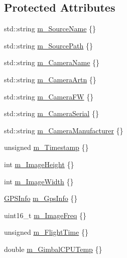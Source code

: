 \subsection*{Protected Attributes}
\begin{DoxyCompactItemize}
\item 
std\+::string \hyperlink{classwtl_1_1_source_meta_data_adb976a4739c879d6329023ffff10ec88}{m\+\_\+\+Source\+Name} \{\}
\item 
std\+::string \hyperlink{classwtl_1_1_source_meta_data_aeddfd5e6b783a06d66b1f19b4d932c03}{m\+\_\+\+Source\+Path} \{\}
\item 
std\+::string \hyperlink{classwtl_1_1_source_meta_data_afcd3f61eccdae1bdb42cd428bdf3a5ea}{m\+\_\+\+Camera\+Name} \{\}
\item 
std\+::string \hyperlink{classwtl_1_1_source_meta_data_aa4fb21498fb68acff7be512b2b452eb4}{m\+\_\+\+Camera\+Artn} \{\}
\item 
std\+::string \hyperlink{classwtl_1_1_source_meta_data_a53ecb2596fe7cf3817dbe30c973a27a3}{m\+\_\+\+Camera\+FW} \{\}
\item 
std\+::string \hyperlink{classwtl_1_1_source_meta_data_ab7de122fe4c98d6e5efc39dba7fd5981}{m\+\_\+\+Camera\+Serial} \{\}
\item 
std\+::string \hyperlink{classwtl_1_1_source_meta_data_a3db4cdd635561f6cbc01bcd3a40c1796}{m\+\_\+\+Camera\+Manufacturer} \{\}
\item 
unsigned \hyperlink{classwtl_1_1_source_meta_data_aa4b47e89e4b6223a81dc6540390ff691}{m\+\_\+\+Timestamp} \{\}
\item 
int \hyperlink{classwtl_1_1_source_meta_data_a0e08fc3eb69bccdbb6f47b627ad937c2}{m\+\_\+\+Image\+Height} \{\}
\item 
int \hyperlink{classwtl_1_1_source_meta_data_aabd51142b0510a3a412f40643afc39ac}{m\+\_\+\+Image\+Width} \{\}
\item 
\hyperlink{classwtl_1_1_g_p_s_info}{G\+P\+S\+Info} \hyperlink{classwtl_1_1_source_meta_data_a76b8450fe6b97b6939b2f8394fb9b1d0}{m\+\_\+\+Gps\+Info} \{\}
\item 
uint16\+\_\+t \hyperlink{classwtl_1_1_source_meta_data_af294c480a5d3c2424b5441ff66255ac5}{m\+\_\+\+Image\+Freq} \{\}
\item 
unsigned \hyperlink{classwtl_1_1_source_meta_data_a361e3e090d8aadb19b5706fc15b3f900}{m\+\_\+\+Flight\+Time} \{\}
\item 
double \hyperlink{classwtl_1_1_source_meta_data_a885dfbeb71a5cf9dae0c8286a98ef757}{m\+\_\+\+Gimbal\+C\+P\+U\+Temp} \{\}
\end{DoxyCompactItemize}
